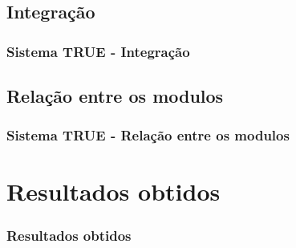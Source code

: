\documentclass{beamer}
\begin{document}
    \subsection{Integração}
		\begin{frame}
	    	\frametitle{Sistema TRUE - Integração}
	    	
	    \end{frame}
    
    \subsection{Relação entre os modulos}
		\begin{frame}
	    	\frametitle{Sistema TRUE - Relação entre os modulos}
	    	
	    \end{frame}

\section{Resultados obtidos}

   	\begin{frame}
    	\frametitle{Resultados obtidos}
    \end{frame}

\end{document}
